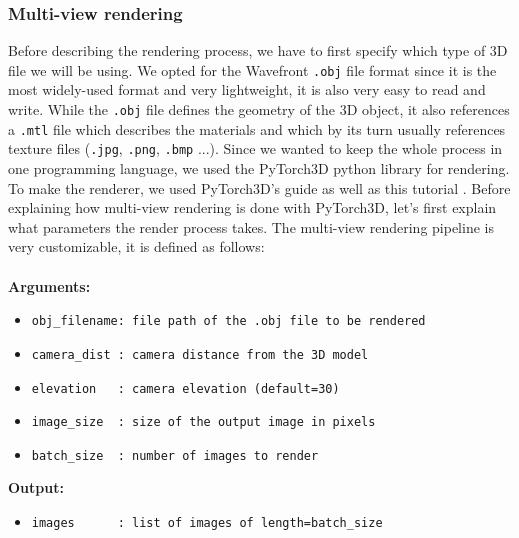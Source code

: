 \documentclass[a4paper,11pt,oneside]{article}
\begin{document}
 \subsubsection{Multi-view rendering}
 Before describing the rendering process, we have to first specify which type of 3D file we will be using. We opted for the Wavefront \texttt{.obj} \cite{obj} file format since it is the most widely-used format and very lightweight, it is also very easy to read and write. While the \texttt{.obj} file defines the geometry of the 3D object, it also references a \texttt{.mtl} file which describes the materials and which by its turn usually references texture files (\texttt{.jpg}, \texttt{.png}, \texttt{.bmp} ...). Since we wanted to keep the whole process in one programming language, we used the PyTorch3D python library \cite{ravi2020pytorch3d} for rendering.  To make the renderer, we used PyTorch3D's guide as well as this tutorial \cite{mediumPyTorch3D}. Before explaining how multi-view rendering is done with PyTorch3D, let's first explain what parameters the render process takes. The multi-view rendering pipeline is very customizable, it is defined as follows:
\\ \\
\textbf{Arguments:}
\begin{itemize}
  \item \verb|obj_filename: file path of the .obj file to be rendered|
  \item \verb|camera_dist : camera distance from the 3D model|
  \item \verb|elevation   : camera elevation (default=30)|
  \item \verb|image_size  : size of the output image in pixels|
  \item \verb|batch_size  : number of images to render|
\end{itemize}
\textbf{Output:}
\begin{itemize}
  \item \verb|images      : list of images of length=batch_size|
\end{itemize}
\end{document}
